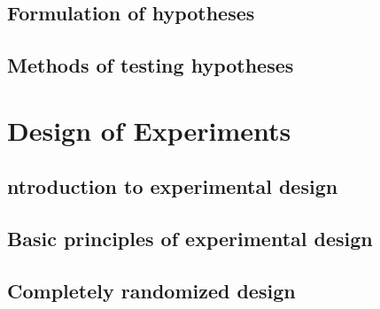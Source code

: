 \documentclass[]{book}
\begin{document}
\hypertarget{formulation-of-hypotheses}{%
\section{Formulation of hypotheses}\label{formulation-of-hypotheses}}

\hypertarget{methods-of-testing-hypotheses}{%
\section{Methods of testing hypotheses}\label{methods-of-testing-hypotheses}}

\hypertarget{design-of-experiments}{%
\chapter{Design of Experiments}\label{design-of-experiments}}

\hypertarget{ntroduction-to-experimental-design}{%
\section{ntroduction to experimental design}\label{ntroduction-to-experimental-design}}

\hypertarget{basic-principles-of-experimental-design}{%
\section{Basic principles of experimental design}\label{basic-principles-of-experimental-design}}

\hypertarget{completely-randomized-design}{%
\section{Completely randomized design}\label{completely-randomized-design}}


\end{document}
